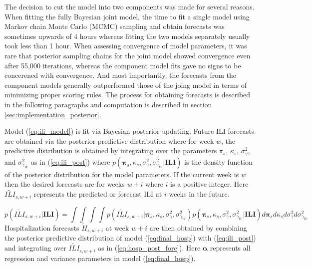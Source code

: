 The decision to cut the model into two components was made for several reasons.
When fitting the fully Bayesian joint model, the time to fit a single model using
Markov chain Monte Carlo (MCMC) sampling and
obtain forecasts was sometimes upwards of 4 hours whereas fitting the two models
separately usually took less than 1 hour. When assessing convergence of model
parameters, it was rare that posterior sampling chains for the joint model
showed convergence even after 55,000 iterations, whereas the component model 
fits gave no signs to be concerened with convergence. And most importantly,
the forecasts from the component models generally outperformed those of the 
joing model in terms of minimizing proper scoring rules. 
The process for obtaining forecasts is described in the following paragraphs 
and computation is described in section \ref{sec:implementation_posterior}.


Model (\ref{eq:ili_model}) is fit via Bayesian posterior updating. Future ILI 
forecasts are obtained via the posterior predictive distribution where for
week $w$, the predictive distribution is obtained by integrating over the 
parameters $\pi_s$, $\kappa_s$, $\sigma^2_{\gamma}$, and $\sigma^2_{\gamma_W}$ 
as in (\ref{eq:ili_post}) where 
$p(\boldsymbol{\pi}_s, \kappa_s, \sigma^2_{\gamma}, \sigma^2_{\gamma_W} | \textbf{ILI})$ 
is the density function of the posterior distribution for the model parameters. 
If the current week is $w$ then the desired forecasts are for weeks $w + i$ 
where $i$ is a positive integer. Here $\widetilde{ILI}_{s,w + i}$ represents the 
predicted or forecast ILI at $i$ weeks in the future.

\begin{equation}
    \label{eq:ili_post}
    p(\widetilde{ILI}_{s,w +i} | \textbf{ILI}) = \int \int \int \int 
    p(\widetilde{ILI}_{s,w + i} | \boldsymbol{\pi}_s, \kappa_s, 
    \sigma^2_{\gamma}, \sigma^2_{\gamma_W}) p(\boldsymbol{\pi}_s, \kappa_s, 
    \sigma^2_{\gamma}, \sigma^2_{\gamma_W} | \textbf{ILI}) 
    d\boldsymbol{\pi}_s d \kappa_s d \sigma^2_{\gamma} d \sigma^2_{\gamma_W}
\end{equation}
Hospitalization forecasts $\widetilde{H}_{s,w + i}$ at week $w + i$ are then
obtained by combining the posterior predictive distribution of model 
(\ref{eq:final_hosp}) with (\ref{eq:ili_post}) and integrating over 
$\widetilde{ILI}_{s,w + i}$ as in (\ref{eq:hosp_post_forc}). Here 
$\boldsymbol{\alpha}$ represents all regression and variance parameters in
model (\ref{eq:final_hosp}).


